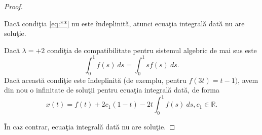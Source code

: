 \documentclass[a4paper,12pt,oneside]{report}
\begin{document}
\begin{proof}
\begin{enumerate}[label=(\alph*)]
\noindent Dac\u{a} condi\c{t}ia \ref{eq:**} nu este \^{i}ndeplinit\u{a}, atunci ecua\c{t}ia integral\u{a} dat\u{a} nu are solu\c{t}ie.


\noindent  Dac\u{a} \(\lambda = +2\) condi\c{t}ia de compatibilitate pentru sistemul algebric de mai sus este
\begin{displaymath}
  \int_{0}^{1}f\left ( s \right ) \ ds = \int_{0}^{1}sf\left ( s \right ) \ ds.
\end{displaymath}
 Dac\u{a} aceast\u{a} condi\c{t}ie este \^{i}ndeplinit\u{a} (de exemplu, pentru \(f\left ( 3t  \right ) = t-1)\), avem din nou o infinitate de solu\c{t}ii pentru ecua\c{t}ia integral\u{a} dat\u{a}, de forma
        \begin{displaymath}
        	x\left ( t \right ) = f\left ( t \right ) + 2c_{1}\left ( 1-t \right ) -2t\int_{0}^{1}f\left ( s \right ) \ ds, c_{1} \in \mathbb{R}.
        \end{displaymath}
        \end{enumerate}

\noindent \^{I}n caz contrar, ecua\c{t}ia integral\u{a} dat\u{a} nu are solu\c{t}ie.
\end{proof}
        		      		      		      		      		      		
\end{document}
